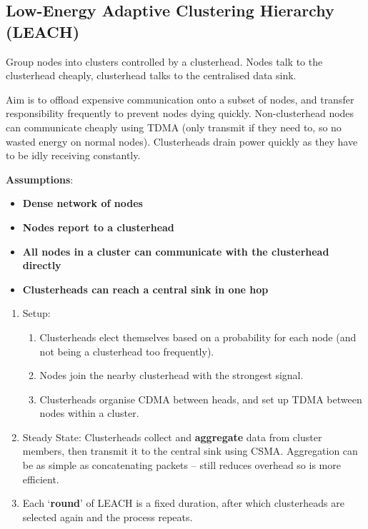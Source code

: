 \documentclass[a4paper, 11pt]{article}
\begin{document}
{    \subsection*{Low-Energy Adaptive Clustering Hierarchy (LEACH)}
    {
        Group nodes into clusters controlled by a clusterhead. Nodes talk to the clusterhead cheaply, clusterhead talks to the centralised data sink.

        Aim is to offload expensive communication onto a subset of nodes, and transfer responsibility frequently to prevent nodes dying quickly. Non-clusterhead nodes can communicate cheaply using TDMA (only transmit if they need to, so no wasted energy on normal nodes). Clusterheads drain power quickly as they have to be idly receiving constantly.

        \textbf{Assumptions}:
        \begin{itemize}
        \item \textbf{Dense network of nodes}
        \item \textbf{Nodes report to a clusterhead}
        \item \textbf{All nodes in a cluster can communicate with the clusterhead directly}
        \item \textbf{Clusterheads can reach a central sink in one hop}
        \end{itemize}

        \begin{enumerate}
        \item
        {
            Setup:
            \begin{enumerate}
            \item Clusterheads elect themselves based on a probability for each node (and not being a clusterhead too frequently).
            \item Nodes join the nearby clusterhead with the strongest signal.
            \item Clusterheads organise CDMA between heads, and set up TDMA between nodes within a cluster.
            \end{enumerate}
        }
        \item Steady State: Clusterheads collect and \textbf{aggregate} data from cluster members, then transmit it to the central sink using CSMA. Aggregation can be as simple as concatenating packets -- still reduces overhead so is more efficient.
        \item Each `\textbf{round}' of LEACH is a fixed duration, after which clusterheads are selected again and the process repeats.
        \end{enumerate}
    }
}
\end{document}
